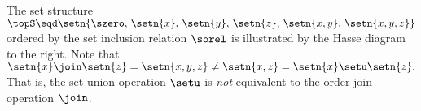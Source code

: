 \begin{minipage}{\tw-50mm}%
\begin{example}
\label{ex:union_neq_join}
  The set structure 
  \\\indentx
  $\topS\eqd\setn{\szero,\, \setn{x},\, \setn{y},\, \setn{z},\, \setn{x,y},\, \setn{x,y,z}}$
  \\
  ordered by the set inclusion relation $\sorel$
  is illustrated by the Hasse diagram to the right.
  Note that 
  \\\indentx
  $\setn{x} \join \setn{z} = \setn{x,y,z} \ne  \setn{x,z} = \setn{x} \setu \setn{z}.$
  \\
  That is, the set union operation $\setu$ is \emph{not} equivalent to the 
  order join operation $\join$.
\end{example}
\end{minipage}%
\hfill{}\hfill\mbox{}\\%

